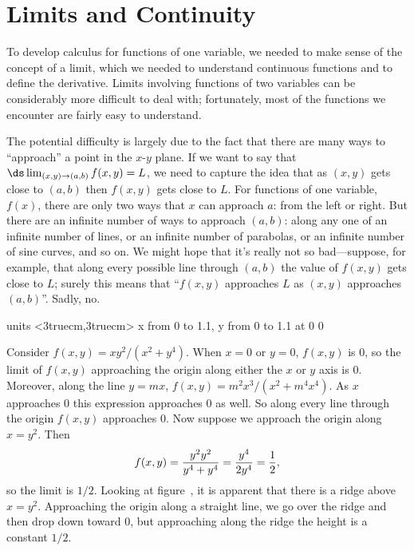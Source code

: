 \section{Limits and Continuity}{}{}

To develop calculus for functions of one variable, we needed to make
sense of the concept of a limit, which we needed to understand
continuous functions and to define the derivative. Limits involving
functions of two variables can be considerably more difficult to deal
with; fortunately, most of the functions we encounter are fairly easy
to understand.

The potential difficulty is largely due to the fact that there are
many ways to ``approach'' a point in the $x$-$y$ plane. If we want to
say that $\ds\lim_{(x,y)\to(a,b)}f(x,y)=L$, we need to capture the
idea that as $(x,y)$ gets close to $(a,b)$ then $f(x,y)$ gets close to
$L$. For functions of one variable, $f(x)$, there are only two ways
that $x$ can approach $a$: from the left or right. But there are an
infinite number of ways to approach $(a,b)$: along any one of an
infinite number of lines, or an infinite number of parabolas, or an
infinite number of sine curves, and so on. We might hope that it's
really not so bad---suppose, for example, that along every possible
line through $(a,b)$ the value of $f(x,y)$ gets close to $L$; surely
this means that ``$f(x,y)$ approaches $L$ as $(x,y)$ approaches
$(a,b)$''. Sadly, no.

\figure
\vbox{\beginpicture
\normalgraphs
\ninepoint
\setcoordinatesystem units <3truecm,3truecm>
\setplotarea x from 0 to 1.1, y from 0 to 1.1
 at 0 0
\endpicture}
\endfigure{$\ds f(x,y)={xy^2\over x^2+y^4}$
(\expandafter\url\expandafter{\liveurl weird_limit.html}%
AP\endurl)}

\begin{example} Consider $f(x,y)=xy^2/(x^2+y^4)$. When
$x=0$ or $y=0$, $f(x,y)$ is 0, so the limit of $f(x,y)$ approaching the
origin along either the $x$ or $y$ axis is 0. Moreover, along the line
$y=mx$, $f(x,y)=m^2x^3/(x^2+m^4x^4)$. As $x$ approaches 0 this expression
approaches 0 as well. So along every line through the origin $f(x,y)$
approaches 0. Now suppose we approach the origin along $x=y^2$. Then 
$$f(x,y)={y^2y^2\over y^4+y^4}={y^4\over2y^4}={1\over2},$$
so the limit is $1/2$. Looking at figure~, it
is apparent that there is a ridge above $x=y^2$. Approaching the
origin along a straight line, we go over the ridge and then drop down
toward 0, but approaching along the ridge the height is a constant
$1/2$. 
\end{example}
\label{exam:weird limit}

